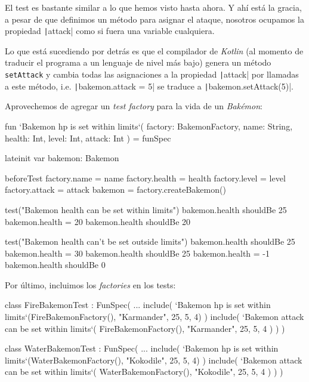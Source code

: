   El test es bastante similar a lo que hemos visto hasta ahora.
  Y ahí está la gracia, a pesar de que definimos un método para asignar el ataque, nosotros
  ocupamos la propiedad \texttt|attack| como si fuera una variable cualquiera.
  
  Lo que está sucediendo por detrás es que el compilador de \textit{Kotlin} (al momento de traducir
  el programa a un lenguaje de nivel más bajo) genera un método \texttt{setAttack} y cambia todas
  las asignaciones a la propiedad \texttt|attack| por llamadas a este método, i.e.
  \texttt|bakemon.attack = 5| se traduce a \texttt|bakemon.setAttack(5)|.

  Aprovechemos de agregar un \textit{test factory} para la vida de un \textit{Bakémon}:

  \begin{kotlin}
    fun `Bakemon hp is set within limits`(
      factory: BakemonFactory,
      name: String, health: Int, level: Int, attack: Int
    ) = funSpec {
      lateinit var bakemon: Bakemon

      beforeTest {
        factory.name = name
        factory.health = health
        factory.level = level
        factory.attack = attack
        bakemon = factory.createBakemon()
      }

      test("Bakemon health can be set within limits") {
        bakemon.health shouldBe 25
        bakemon.health = 20
        bakemon.health shouldBe 20
      }

      test("Bakemon health can't be set outside limits") {
        bakemon.health shouldBe 25
        bakemon.health = 30
        bakemon.health shouldBe 25
        bakemon.health = -1
        bakemon.health shouldBe 0
      }
    }
  \end{kotlin}

  Por último, incluimos los \textit{factories} en los tests:

  \begin{kotlin}
    class FireBakemonTest : FunSpec({
      ...
      include(
        `Bakemon hp is set within limits`(FireBakemonFactory(), "Karmander", 25, 5, 4)
      )
      include(
        `Bakemon attack can be set within limits`(
          FireBakemonFactory(), "Karmander", 25, 5, 4
        )
      )
    })  
  \end{kotlin}

  \begin{kotlin}
    class WaterBakemonTest : FunSpec({
      ...
      include(
        `Bakemon hp is set within limits`(WaterBakemonFactory(), "Kokodile", 25, 5, 4)
      )
      include(
        `Bakemon attack can be set within limits`(
          WaterBakemonFactory(), "Kokodile", 25, 5, 4
        )
      )
    })
  \end{kotlin}

